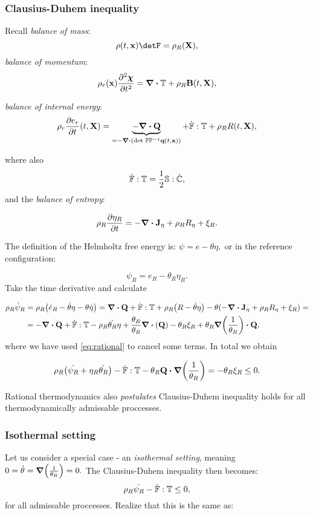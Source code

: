 \documentclass[reqno, a4paper]{article}
\begin{document}
\subsubsection{Clausius-Duhem inequality}
\label{sec:clausius}

Recall \textit{balance of mass}:
\[
	\rho\qty(t,\vb{x}) \detF = \rho_{R}\qty(\vb{X}),
\]
\textit{balance of momentum}:
\[
	\rho_r\qty(\vb{x})\pdv[2]{\vb*{\chi}}{t} = \divergence{\pkstress}+ \rho_R \vb{B}\qty(t,\vb{X}),
\]

\textit{balance of internal energy}:
\[
	\rho_r \pdv{e_r}{t}\qty(t,\vb{X}) = \underbrace{- \divergence{\vb{Q}}}_{= - \divergence{\qty(\detf \inverse{\fgrad}\vb{q}\qty(t,\vb{x}))}} + \dot{\fgrad}: \pkstress + \rho_R R\qty(t,\vb{X}),
\]

where also
\[
	\dot{\mathbb{F}}:\mathbb{T} = \frac{1}{2}\mathbb{S}: \dot{\mathbb{C}},
\]
and the \textit{balance of entropy}:

\[
	\rho_R \pdv{\eta_R}{t} = -\divergence{\vb{J}_{\eta}}+\rho_R R_{\eta} + \xi_R.
\]

The definition of the Helmholtz free energy is: $\psi = e - \theta \eta,$ or in the reference configuration:

\[
	\psi_R = e_R - \theta_R \eta_R.
\]
Take the time derivative and calculate 

\begin{align*}
	\rho_R \dot{\psi}_R &= \rho_R\qty(\dot{e}_R - \dot{\theta}\eta - \theta \dot{\eta}) = \divergence{\vb{Q}} + \dot{\fgrad} : \pkstress + \rho_R \qty(R - \dot{\theta} \eta) - \theta\qty(-\divergence{\vb{J}_{\eta}}+\rho_R R_{\eta}+\xi_R) = \\
			    & = - \divergence{\vb{Q}}+\dot{\fgrad} : \pkstress - \rho_{R} \dot{\theta_R}\eta + \frac{\theta_R}{\theta_R}\divergence{\qty(\vb{Q})} - \theta_R \xi_R +  \theta_R \grad\qty(\frac{1}{\theta_R})\vdot\vb{Q},
\end{align*}
where we have used \ref{eq:rational} to cancel some terms. In total we obtain

\[
	\rho_R\qty(\dot{\psi_R}+ \eta_R \dot{\theta_R}) - \dot{\fgrad}: \pkstress - \theta_R \vb{Q}\vdot \grad\qty(\frac{1}{\theta_R})	= -\theta_R \xi_R \leq 0.
\]

Rational thermodynamics also \textit{postulates} Clausius-Duhem inequality holds for all thermodynamically admissable proccesses.

\subsubsection{Isothermal setting}
\label{sec:isothermal}
Let us consider a special case - an \textit{isothermal setting}, meaning $0 = \dot{\theta} = \grad\qty(\frac{1}{\theta_R}) = 0.$ The Clausius-Duhem inequality then becomes:
\[
	\rho_R \dot{\psi_R} - \dot{\mathbb{F}} : \mathbb{T} \leq 0,
\]
for all admissable proccesses. Realize that this is the same as:
\end{document}
